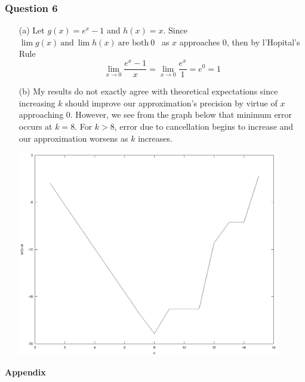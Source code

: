 \documentclass[11pt,a4paper]{article}
\begin{document}
\subsubsection*{Question 6}
\begin{enumerate}
	\item[(a)] Let $g(x)=e^x-1$ and $h(x)=x$. Since \ $\lim g(x) \ \text{and} \ \lim h(x) \ \text{are both} \ 0$ \ as $x$ approaches 0, then by l'Hopital's Rule
	$$\lim_{x\rightarrow 0} \frac{e^x-1}{x} = \lim_{x\rightarrow 0} \frac{e^x}{1}=e^0=1$$
	\item[(b)] My results do not exactly agree with theoretical expectations since increasing $k$ should improve our approximation's precision by virtue of $x$ approaching 0. However, we see from the graph below that minimum error occurs at $k=8$. For $k>8$, error due to cancellation begins to increase and our approximation worsens as $k$ increases.
	\begin{center}
		\includegraphics[width=0.9\textwidth]{plot6b.eps}
	\end{center}
\end{enumerate}

\pagebreak

\textbf{Appendix}
\end{document}
